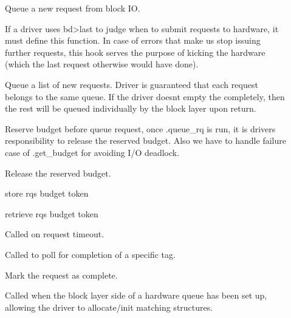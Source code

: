 \documentclass[a4paper,11pt,english]{sphinxmanual}
\begin{document}
\begin{description}
\item[{}] \leavevmode
Queue a new request from block IO.

\item[{}] \leavevmode
If a driver uses bd\sphinxhyphen{}\textgreater{}last to judge when to submit
requests to hardware, it must define this function. In case of errors
that make us stop issuing further requests, this hook serves the
purpose of kicking the hardware (which the last request otherwise
would have done).

\item[{}] \leavevmode
Queue a list of new requests. Driver is guaranteed
that each request belongs to the same queue. If the driver doesn\textquotesingle{}t
empty the  completely, then the rest will be queued
individually by the block layer upon return.

\item[{}] \leavevmode
Reserve budget before queue request, once .queue\_rq is
run, it is driver\textquotesingle{}s responsibility to release the
reserved budget. Also we have to handle failure case
of .get\_budget for avoiding I/O deadlock.

\item[{}] \leavevmode
Release the reserved budget.

\item[{}] \leavevmode
store rq\textquotesingle{}s budget token

\item[{}] \leavevmode
retrieve rq\textquotesingle{}s budget token

\item[{}] \leavevmode
Called on request timeout.

\item[{}] \leavevmode
Called to poll for completion of a specific tag.

\item[{}] \leavevmode
Mark the request as complete.

\item[{}] \leavevmode
Called when the block layer side of a hardware queue has
been set up, allowing the driver to allocate/init matching
structures.


\end{description}
\end{document}
